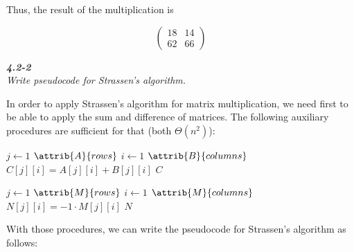 \documentclass[8pt,a4paper]{article}
\begin{document}
Thus, the result of the multiplication is

\begin{equation*}
  \begin{pmatrix}
    18 & 14 \\
    62 & 66
  \end{pmatrix}
\end{equation*}

\begin{framed}
  \textbf{\textit{4.2-2}} \\
  \textit{Write pseudocode for Strassen's algorithm.}
\end{framed}

  In order to apply Strassen's algorithm for matrix multiplication, we need first
to be able to apply the sum and difference of matrices. The following auxiliary
procedures are sufficient for that (both $\Theta(n^{2})$):

\begin{codebox}
  \li \For $j \gets 1$ \To $\attrib{A}{rows}$
        \Do
  \li     \For $i \gets 1$ \To $\attrib{B}{columns}$
            \Do
  \li         $C[j][i] = A[j][i] + B[j][i]$
            \End
      \End
  \li \Return $C$
\end{codebox}

\begin{codebox}
  \li \For $j \gets 1$ \To $\attrib{M}{rows}$
        \Do
  \li     \For $i \gets 1$ \To $\attrib{M}{columns}$
            \Do
  \li         $N[j][i] = -1 \cdot M[j][i]$
            \End
      \End
  \li \Return $N$
\end{codebox}

\newpage
  With those procedures, we can write the pseudocode for Strassen's algorithm
as follows:
\end{document}
